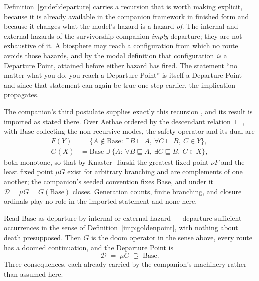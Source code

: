 Definition~\ref{gc:def:departure} carries a recursion that is worth
making explicit, because it is already available in the companion
framework in finished form and because it changes what the model's
hazard is a hazard \emph{of}. The internal and external hazards of the survivorship companion \cite{GoldenSurvivorship} \emph{imply}
departure; they are not exhaustive of it. A biosphere may reach a
configuration from which no route avoids those hazards, and by the
modal definition that configuration \emph{is} a Departure Point,
attained before either hazard has fired. The statement ``no matter what
you do, you reach a Departure Point'' is itself a Departure Point ---
and since that statement can again be true one step earlier, the
implication propagates.

\begin{remark}
\label{gc:rem:thirdpostulate}
The companion's third postulate supplies exactly this recursion
\cite{Aethus}, and its result is imported as stated there. Over
Aethae ordered by the descendant relation $\sqsubseteq$, with
$\mathrm{Base}$ collecting the non-recursive modes, the safety operator
and its dual are
\begin{align*}
F(Y)&=\bigl\{A\notin\mathrm{Base}:\ \exists B\sqsubseteq A,\
\forall C\sqsubseteq B,\ C\in Y\bigr\},\\
G(X)&=\mathrm{Base}\cup\bigl\{A:\ \forall B\sqsubseteq A,\
\exists C\sqsubseteq B,\ C\in X\bigr\},
\end{align*}
both monotone, so that by Knaster--Tarski the greatest fixed point
$\nu F$ and the least fixed point $\mu G$ exist for arbitrary branching
and are complements of one another; the companion's seeded convention
fixes $\mathrm{Base}$, and under it $\mathcal D=\mu G=G(\mathrm{Base})$
closes. Generation counts, finite branching, and closure ordinals play
no role in the imported statement and none here.

Read $\mathrm{Base}$ as departure by internal or external hazard
--- departure-sufficient occurrences in the sense of
Definition~\ref{imp:goldenpoint}, with nothing about death presupposed.
Then $G$ is the doom operator in the sense above, every route has a
doomed continuation, and the Departure Point is
\begin{equation}\label{gc:eq:departurefix}
\mathcal{D}\;=\;\mu G\;\supsetneq\;\mathrm{Base}.
\end{equation}
Three consequences, each already carried by the companion's
machinery rather than assumed here.


\end{remark}
